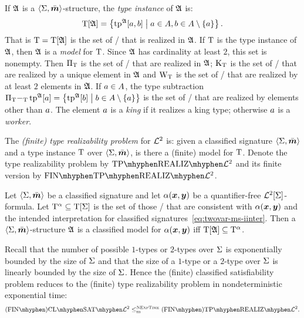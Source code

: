 If $\mathfrak{A}$ is a $\left\langle \mathrm{\Sigma},\bar{\bm{m}} \right\rangle$-structure, the \emph{type instance} of $\mathfrak{A}$
is:
\[
  \mathrm{T}[\mathfrak{A}] = \left\{\operatorname{tp}^{\mathfrak{A}}[a,b]\mathrel{}\middle|\mathrel{}
    a \in A, b \in A \setminus\left\{a\right\}\right\}.
\]
That is $\mathrm{T} = \mathrm{T}[\mathfrak{A}]$ is the set of \twotypes/ that is realized in $\mathfrak{A}$.
If $\mathrm{T}$ is the type instance of $\mathfrak{A}$, then $\mathfrak{A}$ is a \emph{model} for
$\mathrm{T}$.
Since $\mathfrak{A}$ has cardinality at least $2$, this set is nonempty.
Then ${\Pi}_{\mathrm{T}}$ is the set of \onetypes/ that are realized in $\mathfrak{A}$;
${\mathrm{K}}_{\mathrm{T}}$ is the set of \onetypes/ that are realized by a unique element in
$\mathfrak{A}$ and ${\mathrm{W}}_{\mathrm{T}}$ is the set of \onetypes/ that are realized by at least $2$
elements in $\mathfrak{A}$.
If $a \in A$, the type subtraction ${\Pi}_{\mathrm{T}} {-}_{\mathrm{T}} \operatorname{tp}^{\mathfrak{A}}[a] =
\left\{\operatorname{tp}^{\mathfrak{A}}[b]\mathrel{}\middle|\mathrel{}b \in A \setminus \left\{a\right\}\right\}$ is the set of \onetypes/ that
are realized by elements other than $a$.
The element $a$ is a \emph{king} if it realizes a king type; otherwise $a$
is a \emph{worker}.

\begin{definition}
The \emph{(finite) type realizability problem} for $\mathcal{L}^{2}$ is: given a
classified signature $\left\langle \mathrm{\Sigma},\bar{\bm{m}} \right\rangle$ and a type instance $\mathrm{T}$ over
$\left\langle \mathrm{\Sigma},\bar{\bm{m}} \right\rangle$, is there a (finite) model for $\mathrm{T}$.
Denote the type realizability problem by $\Real{\vFo2}$ and its finite version
by $\FinReal{\vFo2}$.
\end{definition}

\begin{remark}\label{rem:red-sat-to-real}
Let $\left\langle \mathrm{\Sigma},\bar{\bm{m}} \right\rangle$ be a classified signature and let $\alpha(\bm{x},\bm{y})$ be a
quantifier-free $\mathcal{L}^{2}[\mathrm{\Sigma}]$-formula.
Let $\mathrm{T}^\alpha \subseteq \mathrm{T}[\mathrm{\Sigma}]$ is the set of those \twotypes/ that are
consistent with $\alpha(\bm{x},\bm{y})$ and the intended interpretation
for classified signatures~\cref{eq:twovar-ms-iinter}.
Then a $\left\langle \mathrm{\Sigma},\bar{\bm{m}} \right\rangle$-structure $\mathfrak{A}$ is a classified model for
$\alpha(\bm{x},\bm{y})$ iff $\mathrm{T}[\mathfrak{A}] \subseteq \mathrm{T}^\alpha$.

Recall that the number of possible $1$-types or $2$-types over $\mathrm{\Sigma}$ is
exponentially bounded by the size of $\mathrm{\Sigma}$ and that the size of a $1$-type or
a $2$-type over $\mathrm{\Sigma}$ is linearly bounded by the size of $\mathrm{\Sigma}$.
Hence the (finite) classified satisfiability problem reduces to the
(finite) type realizability problem in nondeterministic exponential time:
\[
  \FinAClSat{\vFo2} \red\cNExpTime \FinAReal{\vFo2}.
\]
\end{remark}

